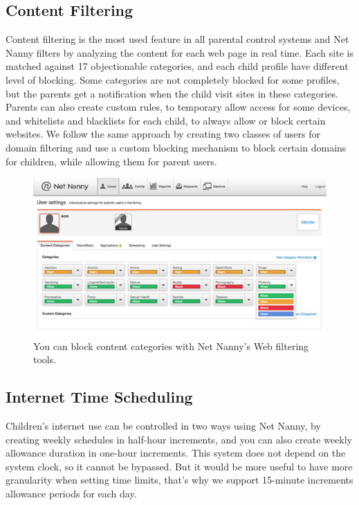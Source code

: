 \subsection{Content Filtering}

Content filtering is the most used feature in all parental control systems and Net Nanny filters by analyzing the content for each web page in real time. Each site is matched against 17 objectionable categories, and each child profile have different level of blocking. Some categories are not completely blocked for some profiles, but the parents get a notification when the child visit sites in these categories. Parents can also create custom rules, to temporary allow access for some devices, and whitelists and blacklists for each child, to always allow or block certain websites. We follow the same approach by creating two classes of users for domain filtering and use a custom blocking mechanism to block certain domains for children, while allowing them for parent users. \parencite{netNannyTomsGuide}

\begin{figure}[th]
\centering
\includegraphics[width=1\textwidth]{Figures/netnanny}
\decoRule
\caption{You can block content categories with Net Nanny's Web filtering tools.}
\label{fig:circle}
\end{figure}

\subsection{Internet Time Scheduling}

Children's internet use can be controlled in two ways using Net Nanny, by creating weekly schedules in half-hour increments, and you can also create weekly allowance duration in one-hour increments. This system does not depend on the system clock, so it cannot be bypassed. But it would be more useful to have more granularity when setting time limits, that's why we support 15-minute increments allowance periods for each day.

